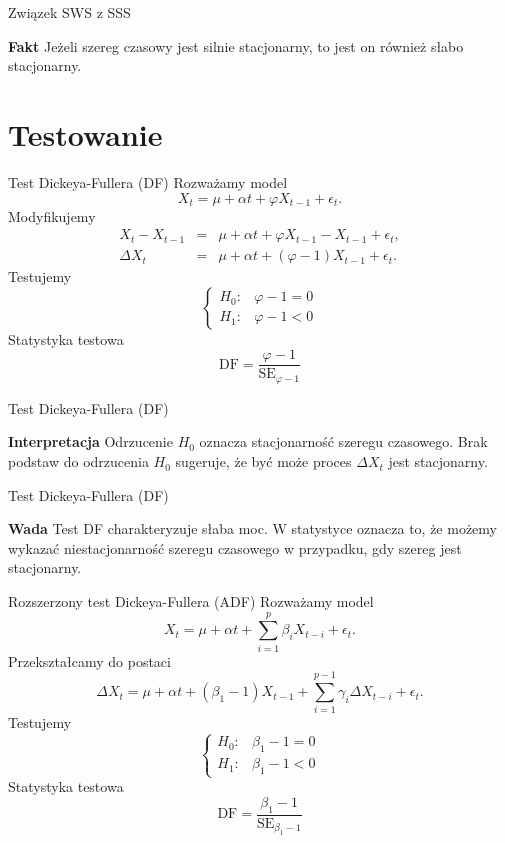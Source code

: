 \documentclass[a4paper, 11pt]{beamer}
\begin{document}
	\begin{frame}{Związek SWS z SSS}
		\begin{alert}{\textbf{Fakt}}
			Jeżeli szereg czasowy jest silnie stacjonarny, to jest on również słabo stacjonarny.
		\end{alert}
	\end{frame}
	
	\section{Testowanie}
	
	\begin{frame}{Test Dickeya-Fullera (DF)}
		Rozważamy model \[
			X_{t} = \mu  + \alpha t + \varphi X_{t-1} + \epsilon_{t}.
		\]
		Modyfikujemy \begin{eqnarray*}
			X_{t}-X_{t-1} & = & \mu + \alpha t + \varphi X_{t-1} - X_{t-1} + \epsilon_{t},\\
			\Delta X_{t} & = & \mu + \alpha t + \left(\varphi - 1\right) X_{t-1} + \epsilon_{t}.
		\end{eqnarray*}
		Testujemy \[
			\begin{cases}
				H_{0}: & \varphi - 1 = 0\\
				H_{1}: & \varphi - 1 < 0
			\end{cases}
		\]
		Statystyka testowa \[
			\mbox{DF} = \frac{\varphi - 1}{\mbox{SE}_{\varphi - 1}}
		\]
	\end{frame}
	
	\begin{frame}{Test Dickeya-Fullera (DF)}
		\begin{alert}{\textbf{Interpretacja}}
			Odrzucenie $H_0$ oznacza stacjonarność szeregu czasowego. Brak podstaw
			do odrzucenia $H_0$ sugeruje, że być może proces $\Delta X_t$ jest
			stacjonarny.
		\end{alert}
	\end{frame}
	
	\begin{frame}{Test Dickeya-Fullera (DF)}
		\begin{alert}{\textbf{Wada}}
			Test DF charakteryzuje słaba moc. W statystyce oznacza to, że możemy
			wykazać niestacjonarność szeregu czasowego w przypadku, gdy szereg
			jest stacjonarny.
		\end{alert}
	\end{frame}
	
	\begin{frame}{Rozszerzony test Dickeya-Fullera (ADF)}
		Rozważamy model \[
			X_{t} = \mu + \alpha t + \sum_{i=1}^{p} \beta_{i} X_{t-i} + \epsilon_{t}.
		\]
		Przekształcamy do postaci \[
			\Delta X_{t} = \mu + \alpha t + \left(\beta_{1} - 1\right) X_{t-1} +  \sum_{i=1}^{p - 1} \gamma_{i} \Delta X_{t-i} + \epsilon_{t}.
		\]
		Testujemy \[
			\begin{cases}
				H_{0}: & \beta_{1} - 1 = 0\\
				H_{1}: & \beta_{1} - 1 < 0
			\end{cases}
		\]
		Statystyka testowa \[
			\mbox{DF} = \frac{\beta_{1} - 1}{\mbox{SE}_{\beta_{1} - 1}}
		\]
	\end{frame}
	
\end{document}
